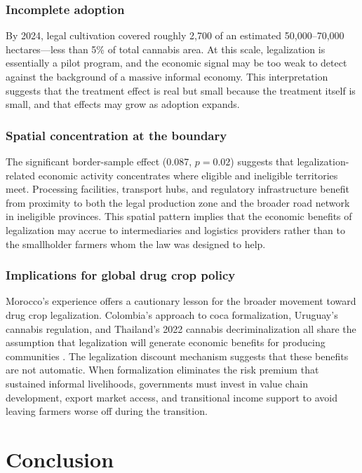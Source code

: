 \documentclass[12pt]{article}
\begin{document}
\subsubsection*{Incomplete adoption} By 2024, legal cultivation covered roughly 2,700 of an estimated 50,000--70,000 hectares---less than 5\% of total cannabis area. At this scale, legalization is essentially a pilot program, and the economic signal may be too weak to detect against the background of a massive informal economy. This interpretation suggests that the treatment effect is real but small because the treatment itself is small, and that effects may grow as adoption expands.

\subsubsection*{Spatial concentration at the boundary} The significant border-sample effect (0.087, $p = 0.02$) suggests that legalization-related economic activity concentrates where eligible and ineligible territories meet. Processing facilities, transport hubs, and regulatory infrastructure benefit from proximity to both the legal production zone and the broader road network in ineligible provinces. This spatial pattern implies that the economic benefits of legalization may accrue to intermediaries and logistics providers rather than to the smallholder farmers whom the law was designed to help.

\subsubsection*{Implications for global drug crop policy} Morocco's experience offers a cautionary lesson for the broader movement toward drug crop legalization. Colombia's approach to coca formalization, Uruguay's cannabis regulation, and Thailand's 2022 cannabis decriminalization all share the assumption that legalization will generate economic benefits for producing communities \citep{Mejia2016}. The legalization discount mechanism suggests that these benefits are not automatic. When formalization eliminates the risk premium that sustained informal livelihoods, governments must invest in value chain development, export market access, and transitional income support to avoid leaving farmers worse off during the transition.


\section{Conclusion}
\end{document}
